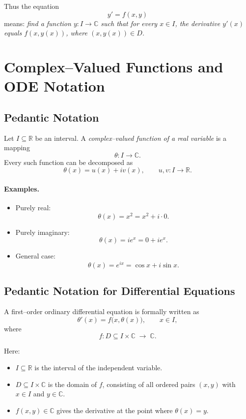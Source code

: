 \documentclass[11pt,a4paper]{article}
\begin{document}
	Thus the equation
	$$
	y' = f(x,y)
	$$
	means: \emph{find a function $y : I \to \mathbb{C}$ such that for every $x \in I$, the derivative $y'(x)$ equals $f(x,y(x))$, where $(x,y(x)) \in D$.}
	
	
	\section*{Complex--Valued Functions and ODE Notation}
	
	\subsection*{Pedantic Notation}
	
	Let $I \subseteq \mathbb{R}$ be an interval.  
	A \emph{complex--valued function of a real variable} is a mapping
	$$
	\theta : I \longrightarrow \mathbb{C}.
	$$
	Every such function can be decomposed as
	$$
	\theta(x) = u(x) + i v(x), \qquad u,v : I \to \mathbb{R}.
	$$
	
	\paragraph{Examples.}
	\begin{itemize}
		\item Purely real:  
		$$
		\theta(x) = x^2 = x^2 + i \cdot 0.
		$$
		\item Purely imaginary:  
		$$
		\theta(x) = i e^x = 0 + i e^x.
		$$
		\item General case:  
		$$
		\theta(x) = e^{ix} = \cos x + i \sin x.
		$$
	\end{itemize}
	
	\subsection*{Pedantic Notation for Differential Equations}
	
	A first--order ordinary differential equation is formally written as
	$$
	\theta'(x) = f\bigl(x, \theta(x)\bigr), \qquad x \in I,
	$$
	where
	$$
	f : D \subseteq I \times \mathbb{C} \;\longrightarrow\; \mathbb{C}.
	$$
	
	Here:
	\begin{itemize}
		\item $I \subseteq \mathbb{R}$ is the interval of the independent variable.
		\item $D \subseteq I \times \mathbb{C}$ is the domain of $f$, consisting of all ordered pairs $(x,y)$ with $x \in I$ and $y \in \mathbb{C}$.
		\item $f(x,y) \in \mathbb{C}$ gives the derivative at the point where $\theta(x) = y$.
	\end{itemize}
	
\end{document}
